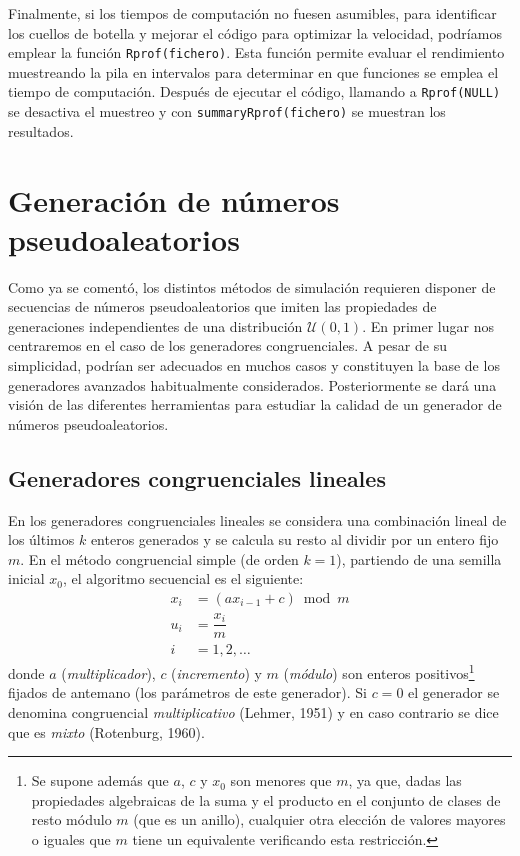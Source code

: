 \documentclass[
]{book}
\theoremstyle{break}
\theoremstyle{definition}
\theoremstyle{definition}
\theoremstyle{definition}
\theoremstyle{definition}
\theoremstyle{remark}
\begin{document}
Finalmente, si los tiempos de computación no fuesen asumibles, para identificar los cuellos de botella y mejorar el código para optimizar la velocidad, podríamos emplear la función \texttt{Rprof(fichero)}.
Esta función permite evaluar el rendimiento muestreando la pila en intervalos para determinar en que funciones se emplea el tiempo de computación.
Después de ejecutar el código, llamando a \texttt{Rprof(NULL)} se desactiva el muestreo y con \texttt{summaryRprof(fichero)} se muestran los resultados.

\hypertarget{cap3}{%
\chapter{Generación de números pseudoaleatorios}\label{cap3}}

Como ya se comentó, los distintos métodos de simulación requieren disponer de secuencias de números pseudoaleatorios que imiten las propiedades de generaciones independientes de una distribución \(\mathcal{U}(0,1)\).
En primer lugar nos centraremos en el caso de los generadores congruenciales. A pesar de su simplicidad, podrían ser adecuados en muchos casos y constituyen la base de los generadores avanzados habitualmente considerados.
Posteriormente se dará una visión de las diferentes herramientas para estudiar la calidad de un generador de números pseudoaleatorios.

\hypertarget{gen-cong}{%
\section{Generadores congruenciales lineales}\label{gen-cong}}

En los generadores congruenciales lineales se considera una combinación lineal de los últimos \(k\) enteros generados y se calcula su resto al dividir por un entero fijo \(m\).
En el método congruencial simple (de orden \(k = 1\)), partiendo de una semilla inicial \(x_0\), el algoritmo secuencial es el siguiente:
\[\begin{aligned}
x_{i}  & = (ax_{i-1}+c) \bmod m \\
u_{i}  & = \dfrac{x_{i}}{m} \\
i  & =1,2,\ldots
\end{aligned}\]
donde \(a\) (\emph{multiplicador}), \(c\) (\emph{incremento}) y \(m\) (\emph{módulo}) son enteros positivos\footnote{Se supone además que \(a\), \(c\) y \(x_0\) son menores que \(m\), ya que, dadas las propiedades algebraicas de la suma y el producto en el conjunto de clases de resto módulo \(m\) (que es un anillo), cualquier otra elección de valores mayores o iguales que \(m\) tiene un equivalente verificando esta restricción.} fijados de antemano (los parámetros de este generador). Si \(c=0\) el generador se denomina congruencial \emph{multiplicativo} (Lehmer, 1951) y en caso contrario se dice que es \emph{mixto} (Rotenburg, 1960).
\end{document}
